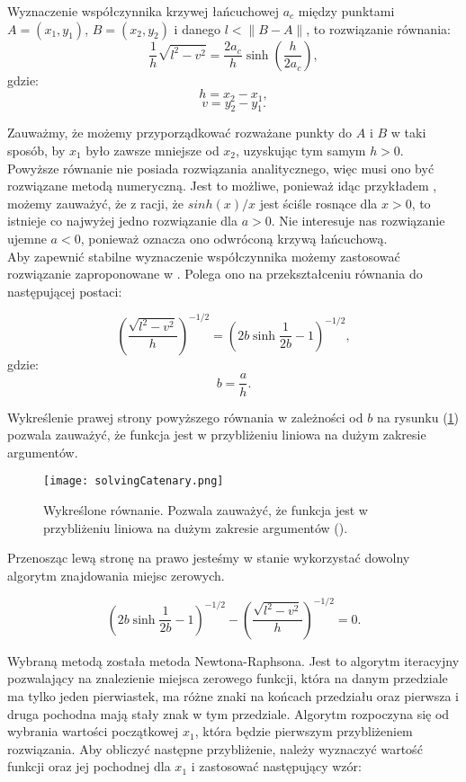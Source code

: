 Wyznaczenie współczynnika krzywej łańcuchowej $a_c$ między punktami $A = (x_1,y_1)$, $B = (x_2,y_2)$ i danego $l < \lVert B - A \rVert$, to rozwiązanie równania:
\[
	\frac{1}{h} \sqrt{l^2-v^2} = \frac{2a_c}{h} \sinh\left( \frac{h}{2a_c} \right),
\]
gdzie:
$$
h = x_2 - x_1,
$$
$$
v = y_2 - y_1.
$$

Zauważmy, że możemy przyporządkować rozważane punkty do $A$ i $B$ w taki sposób, by $x_1$ było zawsze mniejsze od $x_2$, uzyskując tym samym $h > 0$.
\\

Powyższe równanie nie posiada rozwiązania analitycznego, więc musi ono być rozwiązane metodą numeryczną. Jest to możliwe, ponieważ idąc przykładem \cite{Routh_2013}, możemy zauważyć, że z racji, że $sinh(x)/x$ jest ściśle rosnące dla $x>0$, to istnieje co najwyżej jedno rozwiązanie dla $a>0$. Nie interesuje nas rozwiązanie ujemne $a < 0$, ponieważ oznacza ono odwróconą krzywą łańcuchową. 
\\

Aby zapewnić stabilne wyznaczenie współczynnika możemy zastosować rozwiązanie zaproponowane w \cite{1002996}. Polega ono na przekształceniu równania do następującej postaci:

\[
	\left( \frac{\sqrt{l^2 - v^2}}{h} \right)^{-1/2} = \left( 2b\sinh\frac{1}{2b} - 1 \right)^{-1/2},
\]
gdzie:
$$
b = \frac{a}{h}.
$$

Wykreślenie prawej strony powyższego równania w zależności od $b$ na rysunku (\ref{solvingCatenary}) pozwala zauważyć, że funkcja jest w przybliżeniu liniowa na dużym zakresie argumentów.

\begin{figure}[h]
	\centering
	\texttt{[image: solvingCatenary.png]}
	\caption{Wykreślone równanie. Pozwala zauważyć, że funkcja jest w przybliżeniu liniowa na dużym zakresie argumentów (\cite{1002996}).}
	\label{solvingCatenary}
\end{figure}

Przenosząc lewą stronę na prawo jesteśmy w stanie wykorzystać dowolny algorytm znajdowania miejsc zerowych. 


\[
	\left( 2b\sinh\frac{1}{2b} - 1 \right)^{-1/2} - \left( \frac{\sqrt{l^2 - v^2}}{h} \right)^{-1/2} = 0.
\]

Wybraną metodą została metoda Newtona-Raphsona. Jest to algorytm iteracyjny pozwalający na znalezienie miejsca zerowego funkcji, która na danym przedziale ma tylko jeden pierwiastek, ma różne znaki na końcach przedziału oraz pierwsza i druga pochodna mają stały znak w tym przedziale. Algorytm rozpoczyna się od wybrania wartości początkowej $x_1$, która będzie pierwszym przybliżeniem rozwiązania. Aby obliczyć następne przybliżenie, należy wyznaczyć wartość funkcji oraz jej pochodnej dla $x_1$ i zastosować następujący wzór:

